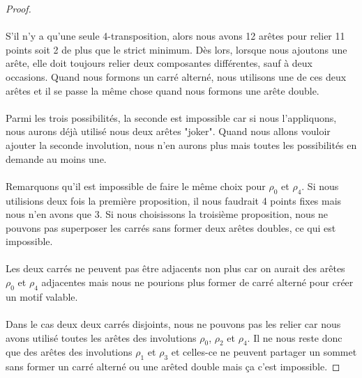 \begin{proof}
\paragraph{}
S'il n'y a qu'une seule 4-transposition, alors nous avons 12 arêtes pour relier 11 points soit 2 de plus que le strict minimum. Dès lors, lorsque nous ajoutons une arête, elle doit toujours relier deux composantes différentes, sauf à deux occasions. Quand nous formons un carré alterné, nous utilisons une de ces deux arêtes et il se passe la même chose quand nous formons une arête double.

\paragraph{}
Parmi les trois possibilités, la seconde est impossible car si nous l'appliquons, nous aurons déjà utilisé nous deux arêtes "joker". Quand nous allons vouloir ajouter la seconde involution, nous n'en aurons plus mais toutes les possibilités en demande au moins une.

\paragraph{}
Remarquons qu'il est impossible de faire le même choix pour $\rho_0$ et $\rho_4$. Si nous utilisions deux fois la première proposition, il nous faudrait 4 points fixes mais nous n'en avons que 3. Si nous choisissons la troisième proposition, nous ne pouvons pas superposer les carrés sans former deux arêtes doubles, ce qui est impossible.

\paragraph{}
Les deux carrés ne peuvent pas être adjacents non plus car on aurait des arêtes $\rho_0$ et $\rho_4$ adjacentes mais nous ne pourions plus former de carré alterné pour créer un motif valable.

\paragraph{}
Dans le cas deux deux carrés disjoints, nous ne pouvons pas les relier car nous avons utilisé toutes les arêtes des involutions $\rho_0$, $\rho_2$ et $\rho_4$. Il ne nous reste donc que des arêtes des involutions $\rho_1$ et $\rho_3$ et celles-ce ne peuvent partager un sommet sans former un carré alterné ou une arêted double mais ça c'est impossible.


\end{proof}
